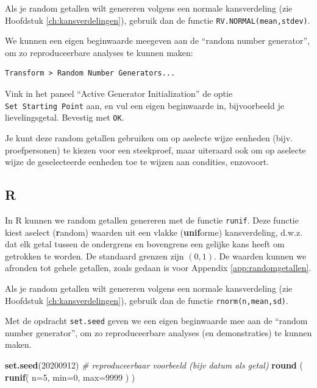 \documentclass[
]{book}
\newenvironment{Shaded}{\begin{snugshade}}{\end{snugshade}}
\newcommand{\CommentTok}[1]{\textcolor[rgb]{0.56,0.35,0.01}{\textit{#1}}}
\newcommand{\DataTypeTok}[1]{\textcolor[rgb]{0.13,0.29,0.53}{#1}}
\newcommand{\DecValTok}[1]{\textcolor[rgb]{0.00,0.00,0.81}{#1}}
\newcommand{\KeywordTok}[1]{\textcolor[rgb]{0.13,0.29,0.53}{\textbf{#1}}}
\newcommand{\NormalTok}[1]{#1}
\begin{document}
Als je random getallen wilt genereren volgens een normale kansverdeling (zie Hoofdstuk \ref{ch:kansverdelingen}), gebruik dan de functie \texttt{RV.NORMAL(mean,stdev)}.

We kunnen een eigen beginwaarde meegeven aan de ``random number generator'', om zo reproduceerbare analyses te kunnen maken:

\begin{verbatim}
Transform > Random Number Generators...
\end{verbatim}

Vink in het paneel ``Active Generator Initialization'' de optie \texttt{Set\ Starting\ Point} aan, en vul een eigen beginwaarde in, bijvoorbeeld je lievelingsgetal. Bevestig met \texttt{OK}.

Je kunt deze random getallen gebruiken om op aselecte wijze eenheden (bijv. proefpersonen) te kiezen voor een steekproef, maar uiteraard ook om op aselecte wijze de geselecteerde eenheden toe te wijzen aan condities, enzovoort.

\hypertarget{r}{%
\subsection{R}\label{r}}

In R kunnen we random getallen genereren met de functie \texttt{runif}. Deze functie kiest aselect (\textbf{r}andom) waarden uit een vlakke (\textbf{unif}orme) kansverdeling, d.w.z. dat elk getal tussen de ondergrens en bovengrens een gelijke kans heeft om getrokken te worden. De standaard grenzen zijn \((0,1)\). De waarden kunnen we afronden tot gehele getallen, zoals gedaan is voor Appendix \ref{app:randomgetallen}.

Als je random getallen wilt genereren volgens een normale kansverdeling (zie Hoofdstuk \ref{ch:kansverdelingen}), gebruik dan de functie \texttt{rnorm(n,mean,sd)}.

Met de opdracht \texttt{set.seed} geven we een eigen beginwaarde mee aan de ``random number generator'', om zo reproduceerbare analyses (en demonstraties) te kunnen maken.

\begin{Shaded}
\begin{Highlighting}[]
\KeywordTok{set.seed}\NormalTok{(}\DecValTok{20200912}\NormalTok{) }\CommentTok{\# reproduceerbaar voorbeeld (bijv datum als getal)}
\KeywordTok{round}\NormalTok{ ( }\KeywordTok{runif}\NormalTok{( }\DataTypeTok{n=}\DecValTok{5}\NormalTok{, }\DataTypeTok{min=}\DecValTok{0}\NormalTok{, }\DataTypeTok{max=}\DecValTok{9999}\NormalTok{ ) )}
\end{Highlighting}
\end{Shaded}
\end{document}
